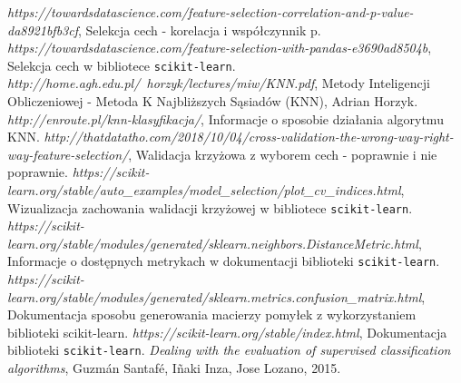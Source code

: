 \documentclass{article}
\begin{document}
\newpage

\begin{thebibliography}{}
\textit{https://towardsdatascience.com/feature-selection-correlation-and-p-value-da8921bfb3cf}, Selekcja cech - korelacja i współczynnik p.
\textit{https://towardsdatascience.com/feature-selection-with-pandas-e3690ad8504b}, Selekcja cech w bibliotece \texttt{scikit-learn}.
\textit{http://home.agh.edu.pl/~horzyk/lectures/miw/KNN.pdf}, Metody Inteligencji Obliczeniowej - Metoda K Najbliższych Sąsiadów (KNN), Adrian Horzyk.
\textit{http://enroute.pl/knn-klasyfikacja/}, Informacje o sposobie działania algorytmu KNN.
\textit{http://thatdatatho.com/2018/10/04/cross-validation-the-wrong-way-right-way-feature-selection/}, Walidacja krzyżowa z wyborem cech - poprawnie i nie poprawnie.
\textit{https://scikit-learn.org/stable/auto\_examples/model\_selection/plot\_cv\_indices.html}, Wizualizacja zachowania walidacji krzyżowej w bibliotece \texttt{scikit-learn}.
\textit{https://scikit-learn.org/stable/modules/generated/sklearn.neighbors.DistanceMetric.html}, Informacje o dostępnych metrykach w dokumentacji biblioteki \texttt{scikit-learn}.
\textit{https://scikit-learn.org/stable/modules/generated/sklearn.metrics.confusion\_matrix.html}, Dokumentacja sposobu generowania macierzy pomyłek z wykorzystaniem biblioteki scikit-learn.
\textit{https://scikit-learn.org/stable/index.html}, Dokumentacja biblioteki \texttt{scikit-learn}.
\textit{Dealing with the evaluation of supervised classification algorithms}, Guzmán Santafé, Iñaki Inza, Jose Lozano, 2015.
\end{thebibliography}
\end{document}
